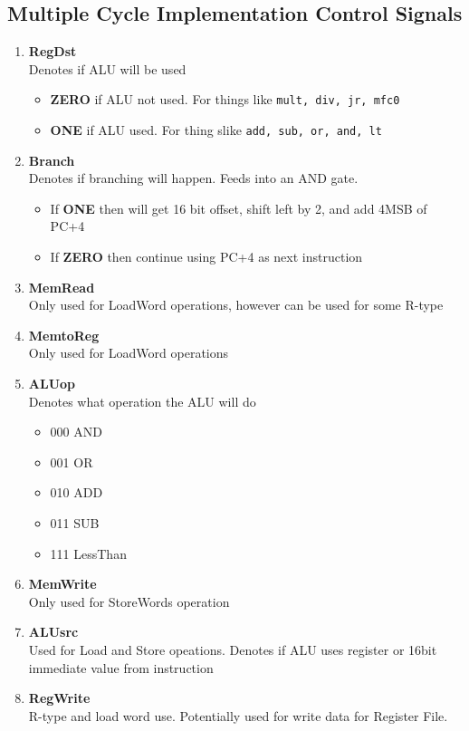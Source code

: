 \documentclass{article}
\newcommand\tab[1][0.5cm]{\hspace*{#1}}
\begin{document}
	\subsection{Multiple Cycle Implementation Control Signals}
		\begin{enumerate}
			\item \textbf{RegDst}
				\\Denotes if ALU will be used
				\begin{itemize}
					\item \textbf{ZERO} if ALU not used. For things like \texttt{mult, div, jr, mfc0}
					\item \textbf{ONE} if ALU used. For thing slike \texttt{add, sub, or, and, lt}
				\end{itemize}

			\item \textbf{Branch}
				\\Denotes if branching will happen. Feeds into an AND gate.
				\begin{itemize}
					\item If \textbf{ONE} then will get 16 bit offset, shift left by 2, and add 4MSB of PC+4
					\item If \textbf{ZERO} then continue using PC+4 as next instruction
				\end{itemize}

			\item \textbf{MemRead}
				\\Only used for LoadWord operations, however can be used for some R-type

			\item \textbf{MemtoReg}
				\\Only used for LoadWord operations

			\item \textbf{ALUop}
				\\Denotes what operation the ALU will do
				\begin{itemize}
					\item 000 \tab AND
					\item 001 \tab OR
					\item 010 \tab ADD
					\item 011 \tab SUB
					\item 111 \tab LessThan
				\end{itemize}

			\item \textbf{MemWrite}
				\\Only used for StoreWords operation

			\item \textbf{ALUsrc}
				\\Used for Load and Store opeations. Denotes if ALU uses register or 16bit immediate value from instruction

			\item \textbf{RegWrite}
				\\R-type and load word use. Potentially used for write data for Register File.
		\end{enumerate}
\end{document}
